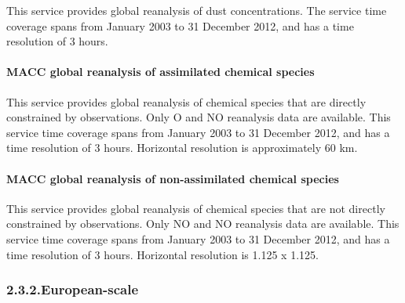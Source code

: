 \documentclass[9pt]{report}
\begin{document}
\noindent{}\mdbr
{}This service provides global reanalysis of dust concentrations.
The service time coverage spans from January 2003 to 31 December 2012, and has a time resolution of 3 hours.%

\paragraph{MACC global reanalysis of assimilated chemical species}\label{sec-macc-global-reanalysis-of-assimilated-chemical-species}%

\noindent{}\mdbr
{}This service provides global reanalysis of chemical species that are directly constrained by observations.
Only O and NO reanalysis data are available.
This service time coverage spans from January 2003 to 31 December 2012, and has a time resolution of 3 hours.
Horizontal resolution is approximately 60 km.%

\paragraph{MACC global reanalysis of non-assimilated chemical species}\label{sec-macc-global-reanalysis-of-non-assimilated-chemical-species}%

\noindent{}\mdbr
{}This service provides global reanalysis of chemical species that are not directly constrained by observations.
Only NO and NO reanalysis data are available.
This service time coverage spans from January 2003 to 31 December 2012, and has a time resolution of 3 hours.
Horizontal resolution is 1.125\textdegree{} x 1.125\textdegree{}.%

\subsubsection{2.3.2.\hspace*{0.5em}European-scale}\label{sec-european-scale}%
\end{document}
